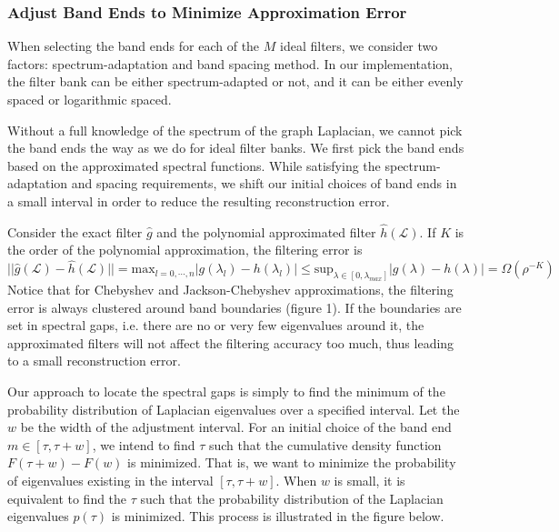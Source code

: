 \documentclass[a4paper]{article}
\newcommand{\La}{\mathcal{L}}
\theoremstyle{definition}
\begin{document}
\subsubsection{Adjust Band Ends to Minimize Approximation Error}
When selecting the band ends for each of the $M$ ideal filters, we consider two factors: spectrum-adaptation and band spacing method. In our implementation, the filter bank can be either spectrum-adapted or not, and it can be either evenly spaced or logarithmic spaced.

Without a full knowledge of the spectrum of the graph Laplacian, we cannot pick the band ends the way as we do for ideal filter banks. We first pick the band ends based on the approximated spectral functions. While satisfying the spectrum-adaptation and spacing requirements, we shift our initial choices of band ends in a small interval in order to reduce the resulting reconstruction error.

Consider the exact filter $\hat{g}$ and the polynomial approximated filter $\hat{h}(\La)$. If $K$ is the order of the polynomial approximation, the filtering error is 
$$||\hat{g}(\La) - \hat{h}(\La)|| = \text{max}_{l = 0,\cdots,n} |g(\lambda_l) - h(\lambda_l)| \leq \text{sup}_{\lambda \in [0, \lambda_{max}]} |g(\lambda) - h(\lambda)| = \Omega(\rho^{-K})$$
Notice that for Chebyshev and Jackson-Chebyshev approximations, the filtering error is always clustered around band boundaries (figure 1). If the boundaries are set in spectral gaps, i.e. there are no or very few eigenvalues around it, the approximated filters will not affect the filtering accuracy too much, thus leading to a small reconstruction error.  

Our approach to locate the spectral gaps is simply to find the minimum of the probability distribution of Laplacian eigenvalues over a specified interval. Let the $w$ be the width of the adjustment interval. For an initial choice of the band end $m \in [\tau, \tau+w]$, we intend to find $\tau$ such that the cumulative density function $F(\tau+w)-F(w)$ is minimized. That is, we want to minimize the probability of eigenvalues existing in the interval $[\tau, \tau+w]$. When $w$ is small, it is equivalent to find the $\tau$ such that the probability distribution of the Laplacian eigenvalues $p(\tau)$ is minimized. This process is illustrated in the figure below.
\end{document}
